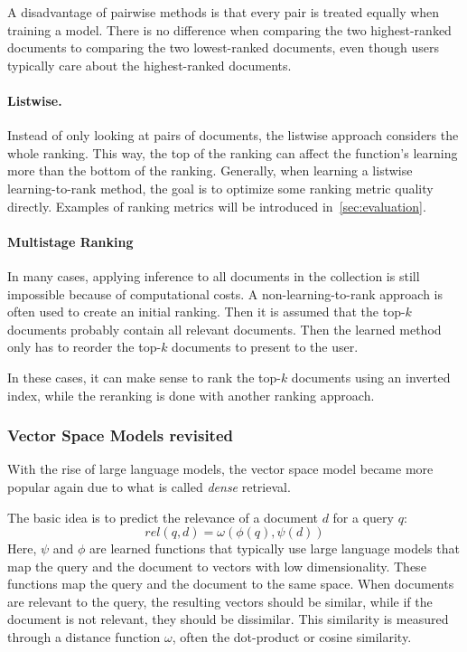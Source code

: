 A disadvantage of pairwise methods is that every pair is treated equally when training a model. There is no difference when comparing the two highest-ranked documents to comparing the two lowest-ranked documents, even though users typically care about the highest-ranked documents. 

\paragraph{Listwise.} Instead of only looking at pairs of documents, the listwise approach considers the whole ranking. This way, the top of the ranking can affect the function's learning more than the bottom of the ranking.
Generally, when learning a listwise learning-to-rank method, the goal is to optimize some ranking metric quality directly. Examples of ranking metrics will be introduced in~\cref{sec:evaluation}.

\paragraph{Multistage Ranking}
\label{sec:multistage}
In many cases, applying inference to all documents in the collection is still impossible because of computational costs. A non-learning-to-rank approach is often used to create an initial ranking. Then it is assumed that the top-$k$ documents probably contain all relevant documents. Then the learned method only has to reorder the top-$k$ documents to present to the user. 

In these cases, it can make sense to rank the top-$k$ documents using an inverted index, while the reranking is done with another ranking approach.

\subsubsection{Vector Space Models revisited}
With the rise of large language models, the vector space model became more popular again due to what is called \emph{dense} retrieval.  

The basic idea is to predict the relevance of a document $d$ for a query $q$:
\begin{equation}
	\mathit{rel}(q, d) = \omega\left(\phi\left(q\right),
	\psi\left(d\right)\right)
\end{equation}
Here, $\psi$ and $\phi$ are learned functions that typically use large language models that map the query and the document to vectors with low dimensionality. These functions map the query and the document to the same space. When documents are relevant to the query, the resulting vectors should be similar, while if the document is not relevant, they should be dissimilar. This similarity is measured through a distance function $\omega$, often the dot-product or cosine similarity.

